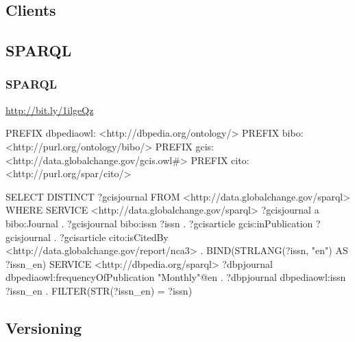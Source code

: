 \documentclass{beamer}
\begin{document}
\subsection{Clients}

\subsection{SPARQL}
\begin{frame}[fragile]
    \frametitle{SPARQL}
     \url{http://bit.ly/1ilgeQz}
\begin{tiny}
\begin{semiverbatim}
PREFIX dbpediaowl: <http://dbpedia.org/ontology/>
PREFIX bibo: <http://purl.org/ontology/bibo/>
PREFIX gcis: <http://data.globalchange.gov/gcis.owl#>
PREFIX cito: <http://purl.org/spar/cito/>

SELECT DISTINCT ?gcisjournal
FROM <http://data.globalchange.gov/sparql>
WHERE {
{
   SERVICE <http://data.globalchange.gov/sparql> {
     ?gcisjournal a bibo:Journal .
     ?gcisjournal bibo:issn ?issn .
     ?gcisarticle gcis:inPublication ?gcisjournal .
     ?gcisarticle cito:isCitedBy <http://data.globalchange.gov/report/nca3> .
   } 
   BIND(STRLANG(?issn, "en") AS ?issn_en)
}  
   SERVICE <http://dbpedia.org/sparql> {
     ?dbpjournal dbpediaowl:frequencyOfPublication "Monthly"@en .
     ?dbpjournal dbpediaowl:issn ?issn_en .
     FILTER(STR(?issn_en) = ?issn)
   } 
}  
\end{semiverbatim}
\end{tiny}

\end{frame}


\subsection{Versioning}
\end{document}
